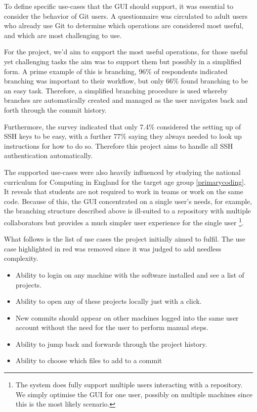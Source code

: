 To define specific use-cases that the GUI should support, it was essential to consider the behavior of Git users. A questionnaire was circulated to adult users who already use Git to determine which operations are considered most useful, and which are most challenging to use. 

For the project, we'd aim to support the most useful operations, for those useful yet challenging tasks the aim was to support them but possibly in a simplified form. A prime example of this is branching, 96\% of respondents indicated branching was important to their workflow, but only 66\% found branching to be an easy task. Therefore, a simplified branching procedure is used whereby branches are automatically created and managed as the user navigates back and forth through the commit history.

Furthermore, the survey indicated that only 7.4\%  considered the setting up of SSH keys to be easy, with a further 77\% saying they always needed to look up instructions for how to do so. Therefore this project aims to handle all SSH authentication automatically.

The supported use-cases were also heavily influenced by studying the national curriculum for Computing in England for the target age group \ref{primarycoding}. It reveals that students are not required to work in teams or work on the same code. Because of this, the GUI concentrated on a single user's needs, for example, the branching structure described above is ill-suited to a repository with multiple collaborators but provides a much simpler user experience for the single user \footnote{The system does fully support multiple users interacting with a repository. We simply optimise the GUI for one user, possibly on multiple machines since this is the most likely scenario. }.

What follows is the list of use cases the project initially aimed to fulfil. The use case highlighted in red was removed since it was judged to add needless complexity.

\begin{itemize}
\item Ability to login on any machine with the software installed and see a list of projects.
\item Ability to open any of these projects locally just with a click.
\item New commits should appear on other machines logged into the same user account without the need for the user to perform manual steps.
\item Ability to jump back and forwards through the project history.
\item \color{red}Ability to choose which files to add to a commit \color{black}
\end{itemize}


